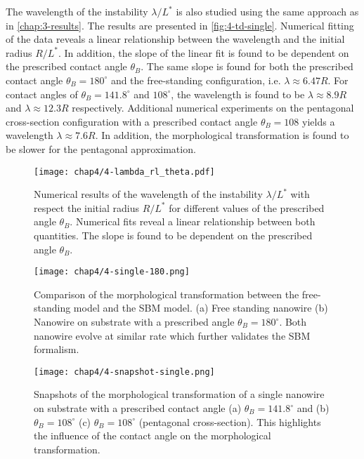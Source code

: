 The wavelength of the instability $\lambda/L^*$ is also studied using the same approach as in \autoref{chap:3-results}. The results are presented in \autoref{fig:4-td-single}. Numerical fitting of the data reveals a linear relationship between the wavelength and the initial radius $R/L^*$. In addition, the slope of the linear fit is found to be dependent on the prescribed contact angle $\theta_B$.
The same slope is found for both the prescribed contact angle $\theta_B=180^\circ$ and the free-standing configuration, i.e. $\lambda \approx 6.47R$. For contact angles of $\theta_B=141.8^\circ$ and $108^\circ$, the wavelength is found to be $\lambda\approx 8.9 R$ and $\lambda\approx 12.3 R$ respectively. Additional numerical experiments on the pentagonal cross-section configuration with a prescribed contact angle $\theta_B=108$ yields a wavelength $\lambda\approx7.6R$. In addition, the morphological transformation is found to be slower for the pentagonal approximation.
\begin{figure}[!htbp]
    \centering
    \texttt{[image: chap4/4-lambda\_rl\_theta.pdf]}
    \caption{Numerical results of the wavelength of the instability $\lambda/L^*$ with respect the initial radius $R/L^*$ for different values of the prescribed angle $\theta_B$. Numerical fits reveal a linear relationship between both quantities. The slope is found to be dependent on the prescribed angle $\theta_B$.}
    \label{fig:4-lambda-single}
\end{figure}
\begin{figure}[H]
    \centering
    \texttt{[image: chap4/4-single-180.png]}
    \caption{Comparison of the morphological transformation between the free-standing model and the SBM model. (a) Free standing nanowire (b) Nanowire on substrate with a prescribed angle $\theta_B=180^\circ$. Both nanowire evolve at similar rate which further validates the SBM formalism.}
    \label{fig:4-comparison-180}
\end{figure}

\begin{figure}[H]
    \centering
    \texttt{[image: chap4/4-snapshot-single.png]}
    \caption{Snapshots of the morphological transformation of a single nanowire on substrate with a prescribed contact angle (a) $\theta_B=141.8^\circ$ and (b) $\theta_B=108^\circ$ (c) $\theta_B=108^\circ$ (pentagonal cross-section). This highlights the influence of the contact angle on the morphological transformation.}
    \label{fig:4-snapshot-single}
\end{figure}

